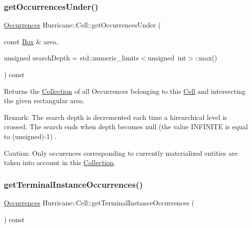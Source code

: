 \subsubsection{\texorpdfstring{get\+Occurrences\+Under()}{getOccurrencesUnder()}}
{\footnotesize\ttfamily \mbox{\hyperlink{namespaceHurricane_a1912927c128eee859af62dbe4cbe0a6b}{Occurrences}} Hurricane\+::\+Cell\+::get\+Occurrences\+Under (\begin{DoxyParamCaption}\item[{const \mbox{\hyperlink{classHurricane_1_1Box}{Box}} \&}]{area,  }\item[{unsigned}]{search\+Depth = {\ttfamily std\+:\+:numeric\+\_\+limits$<$unsigned~int$>$\+:\+:max()} }\end{DoxyParamCaption}) const}

Returns the \mbox{\hyperlink{classHurricane_1_1Collection}{Collection}} of all Occurrences belonging to this \mbox{\hyperlink{classHurricane_1_1Cell}{Cell}} and intersecting the given rectangular area.

\begin{DoxyParagraph}{Remark\+: The search depth is decremented each time a hirearchical}
level is crossed. The search ends when depth becomes null (the value {\ttfamily I\+N\+F\+I\+N\+I\+TE} is equal to {\ttfamily }(unsigned)-\/1) .
\end{DoxyParagraph}
\begin{DoxyParagraph}{Caution\+: Only occurences corresponding to currently materialized}
entities are taken into account in this \mbox{\hyperlink{classHurricane_1_1Collection}{Collection}}. 
\end{DoxyParagraph}
\mbox{\label{classHurricane_1_1Cell_a30b71d9a35ff4e0b59b98ef515f26fc0}} 
\subsubsection{\texorpdfstring{get\+Terminal\+Instance\+Occurrences()}{getTerminalInstanceOccurrences()}}
{\footnotesize\ttfamily \mbox{\hyperlink{namespaceHurricane_a1912927c128eee859af62dbe4cbe0a6b}{Occurrences}} Hurricane\+::\+Cell\+::get\+Terminal\+Instance\+Occurrences (\begin{DoxyParamCaption}{ }\end{DoxyParamCaption}) const}

